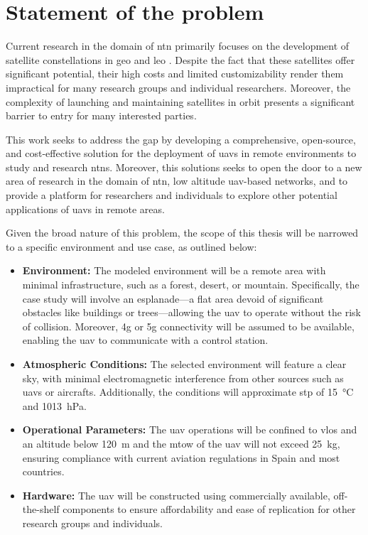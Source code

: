 
\chapter{Statement of the problem}\label{ch:statement_of_problem}

Current research in the domain of \gls{ntn} primarily focuses on the development of satellite constellations in \gls{geo} and \gls{leo} \autocite{non_terrestial_networks_trends}. Despite the fact that these satellites offer significant potential, their high costs and limited customizability render them impractical for many research groups and individual researchers. Moreover, the complexity of launching and maintaining satellites in orbit presents a significant barrier to entry for many interested parties.

This work seeks to address the gap by developing a comprehensive, open-source, and cost-effective solution for the deployment of \glspl{uav} in remote environments to study and research \glspl{ntn}. Moreover, this solutions seeks to open the door to a new area of research in the domain of \gls{ntn}, low altitude \gls{uav}-based networks, and to provide a platform for researchers and individuals to explore other potential applications of \glspl{uav} in remote areas.

Given the broad nature of this problem, the scope of this thesis will be narrowed to a specific environment and use case, as outlined below:

\begin{itemize}
  \item \textbf{Environment:} The modeled environment will be a remote area with minimal infrastructure, such as a forest, desert, or mountain. Specifically, the case study will involve an esplanade—a flat area devoid of significant obstacles like buildings or trees—allowing the \gls{uav} to operate without the risk of collision. Moreover, \gls{4g} or \gls{5g} connectivity will be assumed to be available, enabling the \gls{uav} to communicate with a control station.

  \item \textbf{Atmospheric Conditions:} The selected environment will feature a clear sky, with minimal electromagnetic interference from other sources such as \glspl{uav} or aircrafts. Additionally, the conditions will approximate \gls{stp} of \SI{15}{\degreeCelsius} and \SI{1013}{\hecto\pascal}.

  \item \textbf{Operational Parameters:} The \gls{uav} operations will be confined to \gls{vlos} and an altitude below \SI{120}{\metre} and the \gls{mtow} of the \gls{uav} will not exceed \SI{25}{\kilogram}, ensuring compliance with current aviation regulations in Spain and most countries.

  \item \textbf{Hardware:} The \gls{uav} will be constructed using commercially available, off-the-shelf components to ensure affordability and ease of replication for other research groups and individuals.
\end{itemize}

